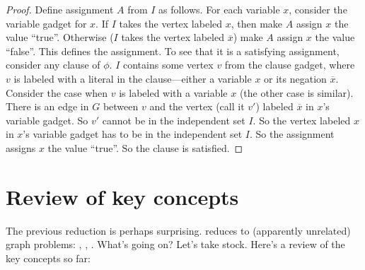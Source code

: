 \documentclass[11pt]{article}
\begin{document}
\begin{proof}
  Define assignment $A$ from $I$ as follows.
  For each variable $x$, consider the variable gadget for $x$.
  If $I$ takes the vertex labeled $x$, then make $A$ assign $x$ the value ``true''.
  Otherwise ($I$ takes the vertex labeled $\overline x$) make $A$ assign $x$ the value ``false''.
  This defines the assignment.
  To see that it is a satisfying assignment,
  consider any clause of $\phi$.
  $I$ contains some vertex $v$ from the clause gadget,
  where $v$ is labeled with a literal in the clause---either a variable $x$ or its negation $\overline x$.
  Consider the case when $v$ is labeled with a variable $x$ (the other case is similar).
  There is an edge in $G$ between $v$ 
  and the vertex (call it $v'$) labeled $\overline x$ in $x$'s variable gadget.
  So $v'$ cannot be in the independent set $I$.
  So the vertex labeled $x$ in $x$'s variable gadget has to be in the independent set $I$.
  So the assignment assigns $x$ the value ``true''.
  So the clause is satisfied.
\end{proof}

\section{Review of key concepts}\label{np: sec: review}

The previous reduction is perhaps surprising.
 reduces to (apparently unrelated) graph problems:
, , .
What's going on?
Let's take stock.
Here's a review of the key concepts so far:
\end{document}
